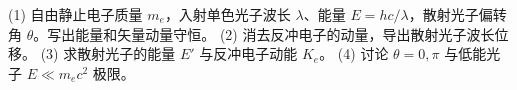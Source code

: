 (1) 自由静止电子质量 \(m_e\)，入射单色光子波长 \(\lambda\)、能量 \(E=hc/\lambda\)，散射光子偏转角 \(\theta\)。写出能量和矢量动量守恒。
(2) 消去反冲电子的动量，导出散射光子波长位移。
(3) 求散射光子的能量 \(E'\) 与反冲电子动能 \(K_e\)。
(4) 讨论 \(\theta=0,\pi\) 与低能光子 \(E\ll m_ec^2\) 极限。
